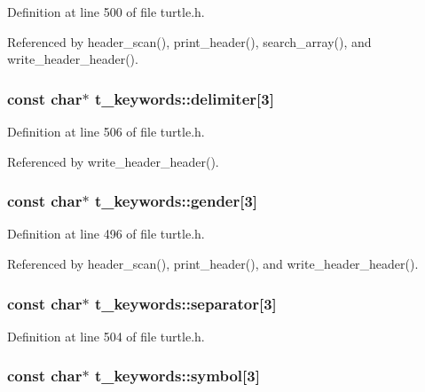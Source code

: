 Definition at line 500 of file turtle.\-h.



Referenced by header\-\_\-scan(), print\-\_\-header(), search\-\_\-array(), and write\-\_\-header\-\_\-header().

\hypertarget{structt__keywords_a6c45bf927b140fadb72f9fb559de8747}{
\subsubsection[{delimiter}]{\setlength{\rightskip}{0pt plus 5cm}const char$\ast$ t\-\_\-keywords\-::delimiter\mbox{[}3\mbox{]}}}\label{structt__keywords_a6c45bf927b140fadb72f9fb559de8747}


Definition at line 506 of file turtle.\-h.



Referenced by write\-\_\-header\-\_\-header().

\hypertarget{structt__keywords_a06ddda8029be04bf68c7ade6dfc4437a}{
\subsubsection[{gender}]{\setlength{\rightskip}{0pt plus 5cm}const char$\ast$ t\-\_\-keywords\-::gender\mbox{[}3\mbox{]}}}\label{structt__keywords_a06ddda8029be04bf68c7ade6dfc4437a}


Definition at line 496 of file turtle.\-h.



Referenced by header\-\_\-scan(), print\-\_\-header(), and write\-\_\-header\-\_\-header().

\hypertarget{structt__keywords_ab5f53aff6370dc198899e02fd7800712}{
\subsubsection[{separator}]{\setlength{\rightskip}{0pt plus 5cm}const char$\ast$ t\-\_\-keywords\-::separator\mbox{[}3\mbox{]}}}\label{structt__keywords_ab5f53aff6370dc198899e02fd7800712}


Definition at line 504 of file turtle.\-h.

\hypertarget{structt__keywords_aa821df09f18dd1e77636e08dff5e0dde}{
\subsubsection[{symbol}]{\setlength{\rightskip}{0pt plus 5cm}const char$\ast$ t\-\_\-keywords\-::symbol\mbox{[}3\mbox{]}}}\label{structt__keywords_aa821df09f18dd1e77636e08dff5e0dde}


